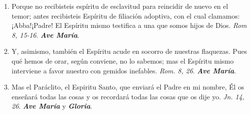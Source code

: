 \documentclass[../../devocionario.tex]{subfiles}
\begin{document}
\begin{enumerate}
        \item Porque no recibisteis espíritu de esclavitud para reincidir de nuevo en el temor; antes recibisteis Espíritu de filiación adoptiva, con el cual clamamos: ¡Abba!¡Padre! 
            El Espíritu mismo testifica a una que somos hijos de Dios. \emph{Rom 8, 15-16}. \textbf{\emph{Ave María}}.

        \item Y, asimismo, también el Espíritu acude en socorro de nuestras flaquezas. Pues qué hemos de orar, según conviene, no lo sabemos; mas el Espíritu mismo interviene a 
            favor nuestro con gemidos inefables. \emph{Rom. 8, 26}. \textbf{\emph{Ave María}}.

        \item Mas el Paráclito, el Espiritu Santo, que enviará el Padre en mi nombre, Él os enseñará todas las cosas y os recordará todas las cosas que os dije yo. 
            \emph{Jn. 14, 26}. \textbf{\emph{Ave María}} y \textbf{\emph{Gloria}}.

    \end{enumerate}
\end{document}
